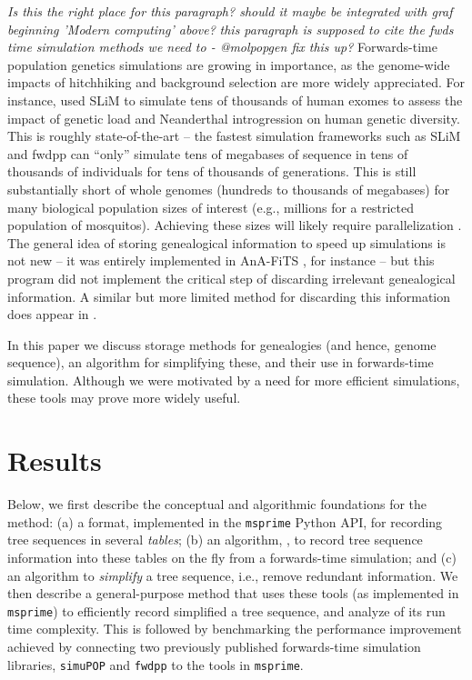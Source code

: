 \documentclass{article}
\newcommand{\simupop}{\texttt{simuPOP}}
\newcommand{\fwdpp}{\texttt{fwdpp}}
\newcommand{\msprime}{\texttt{msprime}}
\newcommand{\plr}[1]{{\em \color{blue} #1}}
\newcommand{\jda}[1]{{\em \color{cyan} #1}}
\begin{document}
\jda{Is this the right place for this paragraph? should it maybe be integrated
	with graf beginning 'Modern computing' above?}
\plr{this paragraph is supposed to cite the fwds time simulation methods we need to - @molpopgen fix this up?}
Forwards-time population genetics simulations are growing in importance,
as the genome-wide impacts of hitchhiking and background selection are more widely appreciated.
For instance, \citet{harris2016genetic} used SLiM \citep{haller2017flexible} to simulate tens of thousands of human exomes
to assess the impact of genetic load and Neanderthal introgression on human genetic diversity.
This is roughly state-of-the-art
-- the fastest simulation frameworks such as SLiM and fwdpp \citep{fwdpp}
can ``only'' simulate tens of megabases of sequence in tens of thousands of individuals
for tens of thousands of generations.
This is still substantially short of whole genomes (hundreds to thousands of megabases)
for many biological population sizes of interest
(e.g., millions for a restricted population of mosquitos).
Achieving these sizes will likely require parallelization \citep{lawrie2017accelerating}.
The general idea of storing genealogical information to speed up simulations is not new --
it was entirely implemented in AnA-FiTS \citep{aberer2013rapid}, for instance --
but this program did not implement the critical step of discarding irrelevant genealogical information.
A similar but more limited method for discarding this information does appear in \citet{padhukasahasram2008exploring}.

In this paper we discuss storage methods for genealogies (and hence, genome sequence),
an algorithm for simplifying these,
and their use in forwards-time simulation.
Although we were motivated by a need for more efficient simulations,
these tools may prove more widely useful.


\section*{Results}


Below, we first describe the conceptual and algorithmic foundations for the method:
(a) a format, implemented in the \msprime{} Python API,
for recording tree sequences in several \emph{tables};
(b) an algorithm, , to record tree sequence information into these tables on the fly
    from a forwards-time simulation;
and (c) an algorithm to \emph{simplify} a tree sequence, i.e., remove redundant information.
We then describe a general-purpose method that uses these tools
(as implemented in \msprime{})
to efficiently record simplified a tree sequence,
and analyze of its run time complexity.
This is followed by benchmarking the performance improvement achieved by connecting
two previously published forwards-time simulation libraries,
\simupop{} \citep{simupop} and \fwdpp{} \citep{fwdpp}
to the tools in \msprime{}.
\end{document}
